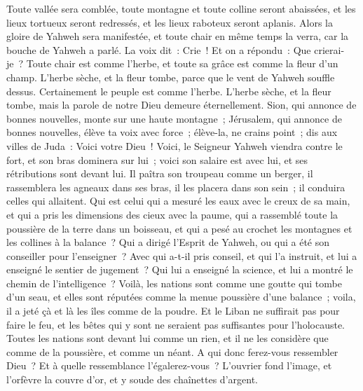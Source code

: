 \begin{multicols}{2}
Toute vallée sera comblée, toute montagne et toute colline seront abaissées, et les lieux tortueux seront redressés, et les lieux raboteux seront aplanis.
Alors la gloire de Yahweh sera manifestée, et toute chair en même temps la verra, car la bouche de Yahweh a parlé.
La voix dit~: Crie~! Et on a répondu~: Que crierai-je~? Toute chair est comme l'herbe, et toute sa grâce est comme la fleur d'un champ.
L'herbe sèche, et la fleur tombe, parce que le vent de Yahweh souffle dessus. Certainement le peuple est comme l'herbe.
L'herbe sèche, et la fleur tombe, mais la parole de notre Dieu demeure éternellement.
Sion, qui annonce de bonnes nouvelles, monte sur une haute montagne~; Jérusalem, qui annonce de bonnes nouvelles, élève ta voix avec force~; élève-la, ne crains point~; dis aux villes de Juda~: Voici votre Dieu~!
Voici, le Seigneur Yahweh viendra contre le fort, et son bras dominera sur lui~; voici son salaire est avec lui, et ses rétributions sont devant lui.
Il paîtra son troupeau comme un berger, il rassemblera les agneaux dans ses bras, il les placera dans son sein~; il conduira celles qui allaitent.
Qui est celui qui a mesuré les eaux avec le creux de sa main, et qui a pris les dimensions des cieux avec la paume, qui a rassemblé toute la poussière de la terre dans un boisseau, et qui a pesé au crochet les montagnes et les collines à la balance~?
Qui a dirigé l'Esprit de Yahweh, ou qui a été son conseiller pour l'enseigner~?
Avec qui a-t-il pris conseil, et qui l'a instruit, et lui a enseigné le sentier de jugement~? Qui lui a enseigné la science, et lui a montré le chemin de l'intelligence~?
Voilà, les nations sont comme une goutte qui tombe d'un seau, et elles sont réputées comme la menue poussière d'une balance~; voila, il a jeté çà et là les îles comme de la poudre.
Et le Liban ne suffirait pas pour faire le feu, et les bêtes qui y sont ne seraient pas suffisantes pour l'holocauste.
Toutes les nations sont devant lui comme un rien, et il ne les considère que comme de la poussière, et comme un néant.
A qui donc ferez-vous ressembler Dieu~? Et à quelle ressemblance l'égalerez-vous~?
L'ouvrier fond l'image, et l'orfèvre la couvre d'or, et y soude des chaînettes d'argent.

\end{multicols}
